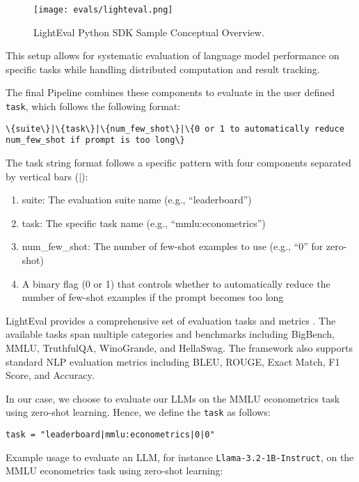 \begin{figure}[h]
\centering
\texttt{[image: evals/lighteval.png]}
\caption{LightEval Python SDK Sample Conceptual Overview.}
\label{fig:lighteval}
\end{figure}

This setup allows for systematic evaluation of language model performance on specific tasks while handling distributed computation and result tracking.

The final Pipeline combines these components to evaluate in the user defined \texttt{task}, which follows the following format:

\begin{verbatim}
\{suite\}|\{task\}|\{num_few_shot\}|\{0 or 1 to automatically reduce num_few_shot if prompt is too long\}
\end{verbatim}

The task string format follows a specific pattern with four components separated by vertical bars ($|$):

\begin{enumerate}
\item suite: The evaluation suite name (e.g., ``leaderboard'')
\item task: The specific task name (e.g., ``mmlu:econometrics'') 
\item num\_few\_shot: The number of few-shot examples to use (e.g., ``0'' for zero-shot)
\item A binary flag (0 or 1) that controls whether to automatically reduce the number of few-shot examples if the prompt becomes too long
\end{enumerate}
LightEval provides a comprehensive set of evaluation tasks  and metrics . The available tasks span multiple categories and benchmarks including BigBench, MMLU, TruthfulQA, WinoGrande, and HellaSwag. The framework also supports standard NLP evaluation metrics including BLEU, ROUGE, Exact Match, F1 Score, and Accuracy.

In our case, we choose to evaluate our LLMs on the MMLU econometrics task using zero-shot learning. Hence, we define the \texttt{task} as follows:

\begin{verbatim}
task = "leaderboard|mmlu:econometrics|0|0"
\end{verbatim}

Example usage to evaluate an LLM, for instance \texttt{Llama-3.2-1B-Instruct}, on the MMLU econometrics task using zero-shot learning:

